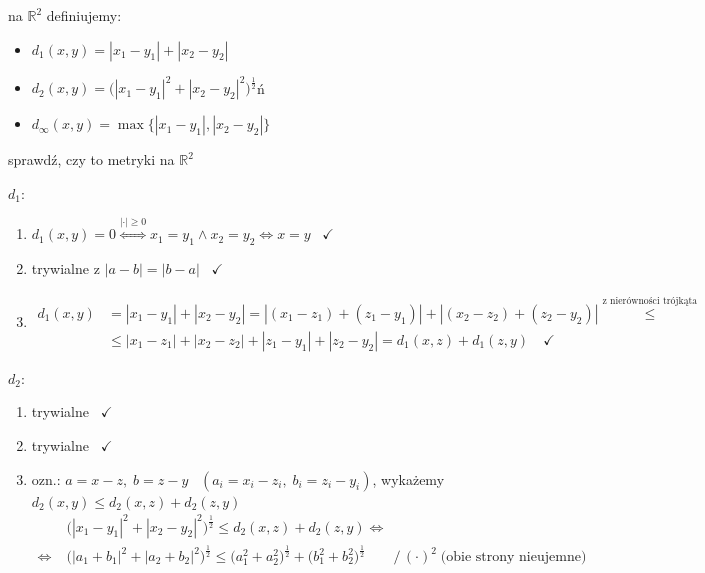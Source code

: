 \documentclass[a4paper,12pt]{article}
\begin{document}
\newpage
{} \; na \(\mathbb{R}^2\) definiujemy:
\smallskip
\begin{itemize}
    \item \(d_1(x, y) = |x_1 - y_1| + |x_2 - y_2|\)
    \item \(d_2(x, y) = \big(|x_1 - y_1|^2 + |x_2 - y_2|^2\big)^{\frac{1}{2}}\)ń
    \smallskip
    \item \(d_\infty(x, y) = \max\{|x_1 - y_1|, |x_2 - y_2|\}\)
\end{itemize}
\smallskip
sprawdź, czy to metryki na \(\mathbb{R}^2\)
\smallskip
\begin{podpunkty}
    \item \(d_1\):
    \begin{enumerate}[label=\roman*), leftmargin=1.9em, itemsep=0.2em, topsep=0.2em, parsep=0pt, partopsep=0pt]
        \item \(d_1(x, y) = 0 \overset{|\cdot| \geq 0}{\iff} x_1 = y_1 \land x_2 = y_2 \iff x = y\) \, \(\checkmark\)
        \item trywialne z \(|a - b| = |b - a|\) \, \(\checkmark\)
        \item
        \begin{align*}
        d_1(x, y) &= |x_1 - y_1| + |x_2 - y_2| = |(x_1 - z_1) + (z_1 - y_1)| + |(x_2 - z_2) + (z_2 - y_2)| \overset{\text{z nierówności trójkąta}}{\leq} \\
        &\leq |x_1 - z_1| + |x_2 - z_2| + |z_1 - y_1| + |z_2 - y_2| = d_1(x, z) + d_1(z, y) \quad \checkmark
        \end{align*}
    \end{enumerate}
    \item \(d_2\):
    \begin{enumerate}[label=\roman*), leftmargin=1.9em, itemsep=0.2em, topsep=0.2em, parsep=0pt, partopsep=0pt]
        \item trywialne \, \(\checkmark\)
        \item trywialne \, \(\checkmark\)
        \item ozn.: \(a = x - z, \; b = z - y\) \, \((a_i = x_i - z_i, \; b_i = z_i - y_i)\), \; wykażemy \(d_2(x, y) \leq d_2(x, z) + d_2(z, y)\)
        \begin{align*}
        & \big(|x_1 - y_1|^2 + |x_2 - y_2|^2\big)^{\frac{1}{2}} \leq d_2(x, z) + d_2(z, y) \iff \\
        \iff \; & \big(|a_1 + b_1|^2 + |a_2 + b_2|^2\big)^{\frac{1}{2}} \leq \big(a_1^2 + a_2^2\big)^{\frac{1}{2}} + \big(b_1^2 + b_2^2\big)^{\frac{1}{2}} \qquad \big/ \, (\cdot)^2 \; \text{(obie strony nieujemne)} \\

\end{align*}
\end{enumerate}
\end{podpunkty}
\end{document}
